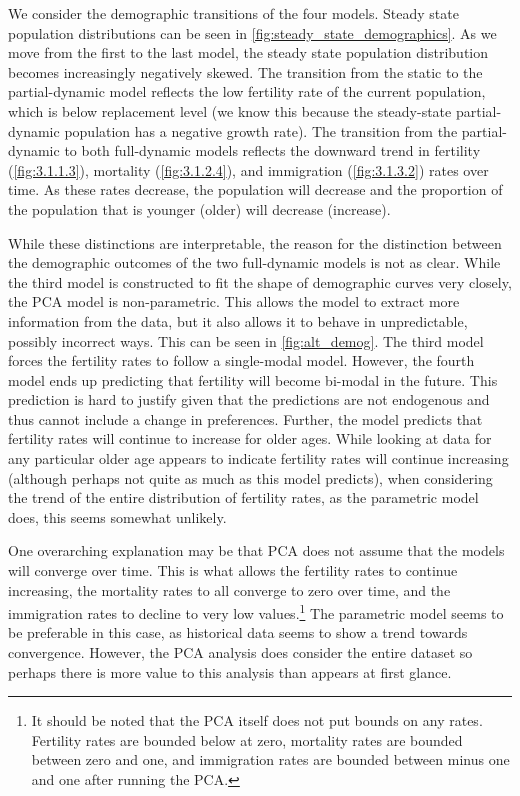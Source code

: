 \documentclass[10pt]{article}
\numberwithin{equation}{subsection}
\begin{document}
\par We consider the demographic transitions of the four models. Steady state population distributions can be seen in \autoref{fig:steady_state_demographics}. As we move from the first to the last model, the steady state population distribution becomes increasingly negatively skewed. The transition from the static to the partial-dynamic model reflects the low fertility rate of the current population, which is below replacement level (we know this because the steady-state partial-dynamic population has a negative growth rate). The transition from the partial-dynamic to both full-dynamic models reflects the downward trend in fertility (\autoref{fig:3.1.1.3}), mortality (\autoref{fig:3.1.2.4}), and immigration (\autoref{fig:3.1.3.2}) rates over time. As these rates decrease, the population will decrease and the proportion of the population that is younger (older) will decrease (increase).

\par While these distinctions are interpretable, the reason for the distinction between the demographic outcomes of the two full-dynamic models is not as clear. While the third model is constructed to fit the shape of demographic curves very closely, the PCA model is non-parametric. This allows the model to extract more information from the data, but it also allows it to behave in unpredictable, possibly incorrect ways. This can be seen in \autoref{fig:alt_demog}. The third model forces the fertility rates to follow a single-modal model. However, the fourth model ends up predicting that fertility will become bi-modal in the future. This prediction is hard to justify given that the predictions are not endogenous and thus cannot include a change in preferences. Further, the model predicts that fertility rates will continue to increase for older ages. While looking at data for any particular older age appears to indicate fertility rates will continue increasing (although perhaps not quite as much as this model predicts), when considering the trend of the entire distribution of fertility rates, as the parametric model does, this seems somewhat unlikely.

\par One overarching explanation may be that PCA does not assume that the models will converge over time. This is what allows the fertility rates to continue increasing, the mortality rates to all converge to zero over time, and the immigration rates to decline to very low values.\footnote{It should be noted that the PCA itself does not put bounds on any rates. Fertility rates are bounded below at zero, mortality rates are bounded between zero and one, and immigration rates are bounded between minus one and one after running the PCA.} The parametric model seems to be preferable in this case, as historical data seems to show a trend towards convergence. However, the PCA analysis does consider the entire dataset so perhaps there is more value to this analysis than appears at first glance.
\end{document}
